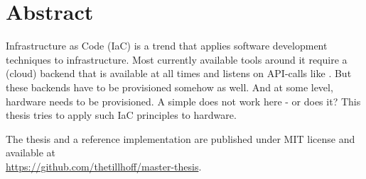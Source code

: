 \titlespacing*{\chapter}{170pt}{0pt}{10pt} %

\chapter*{Abstract}
\begin{addmargin}[2em]{2em}
Infrastructure as Code (IaC) is a trend that applies software development techniques to infrastructure. Most currently available tools around it require a (cloud) backend that is available at all times and listens on API-calls like . But these backends have to be provisioned somehow as well. And at some level, hardware needs to be provisioned. A simple  does not work here - or does it? This thesis tries to apply such IaC principles to hardware.

\end{addmargin}

\bigskip
\begin{addmargin}[2em]{2em}
The thesis and a reference implementation are published under MIT license and available at \\
\url{https://github.com/thetillhoff/master-thesis}.
\end{addmargin}


\titlespacing*{\chapter}{0pt}{0pt}{10pt} %
